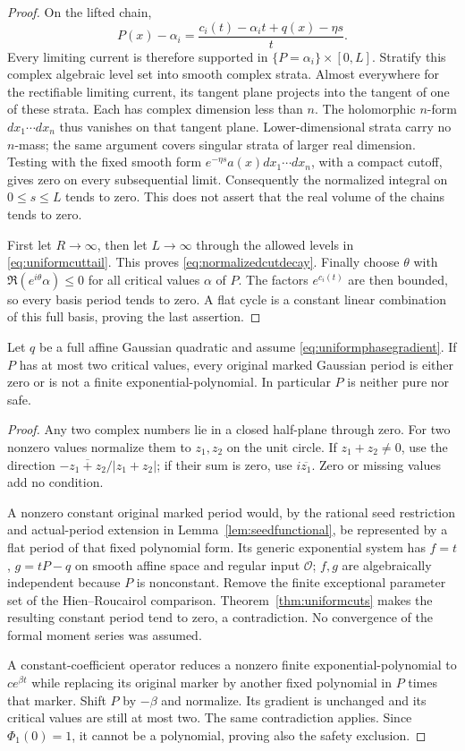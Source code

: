 \begin{proof}
On the lifted chain,
\[
 P(x)-\alpha_i=
       \frac{c_i(t)-\alpha_i t+q(x)-\eta s}{t}.
\]
Every limiting current is therefore supported in
$\{P=\alpha_i\}\times[0,L]$. Stratify this complex algebraic
level set into smooth complex strata. Almost everywhere for the
rectifiable limiting current, its tangent plane projects into
the tangent of one of these strata. Each has complex dimension
less than $n$. The holomorphic $n$-form $dx_1\cdots dx_n$ thus
vanishes on that tangent plane. Lower-dimensional strata carry
no $n$-mass; the same argument covers singular strata of larger
real dimension. Testing with the fixed smooth form
$e^{-\eta s}a(x)dx_1\cdots dx_n$, with a compact cutoff, gives
zero on every subsequential limit. Consequently the normalized
integral on $0\le s\le L$ tends to zero. This does not assert
that the real volume of the chains tends to zero.

First let $R\to\infty$, then let $L\to\infty$ through the
allowed levels in \eqref{eq:uniformcuttail}. This proves
\eqref{eq:normalizedcutdecay}. Finally choose $\theta$ with
$\Re(e^{i\theta}\alpha)\le0$ for all critical values $\alpha$
of $P$. The factors $e^{c_i(t)}$ are then bounded, so every basis
period tends to zero. A flat cycle is a constant linear
combination of this full basis, proving the last assertion.
\end{proof}

\begin{corollary}\label{cor:twocriticalvalues}
Let $q$ be a full affine Gaussian quadratic and assume
\eqref{eq:uniformphasegradient}. If $P$ has at most two critical
values, every original marked Gaussian period is either zero or
is not a finite exponential-polynomial. In particular $P$ is
neither pure nor safe.
\end{corollary}
\begin{proof}
Any two complex numbers lie in a closed half-plane through zero.
For two nonzero values normalize them to $z_1,z_2$ on the unit
circle. If $z_1+z_2\ne0$, use the direction
$-\overline{z_1+z_2}/|z_1+z_2|$; if their sum is zero, use
$i\overline{z_1}$. Zero or missing values add no condition.

A nonzero constant original marked period would, by the rational
seed restriction and actual-period extension in
Lemma~\ref{lem:seedfunctional}, be represented by a flat period
of that fixed polynomial form. Its generic exponential system
has $f=t$, $g=tP-q$ on smooth affine space and regular input
$\mathcal O$; $f,g$ are algebraically independent because $P$
is nonconstant. Remove the finite exceptional parameter set of
the Hien--Roucairol comparison. Theorem~\ref{thm:uniformcuts}
makes the resulting constant period tend to zero, a contradiction.
No convergence of the formal moment series was assumed.

A constant-coefficient operator reduces a nonzero finite
exponential-polynomial to $c e^{\beta t}$ while replacing its
original marker by another fixed polynomial in $P$ times that
marker. Shift $P$ by $-\beta$ and normalize. Its gradient is
unchanged and its critical values are still at most two. The
same contradiction applies. Since $\Phi_1(0)=1$, it cannot be
a polynomial, proving also the safety exclusion.
\end{proof}

